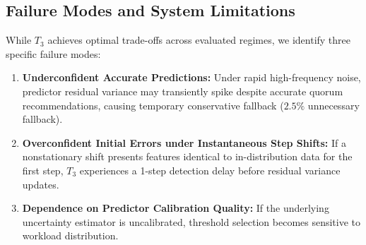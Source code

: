 \subsection{Failure Modes and System Limitations}
While $T_3$ achieves optimal trade-offs across evaluated regimes, we identify three specific failure modes:
\begin{enumerate}
    \item \textbf{Underconfident Accurate Predictions:} Under rapid high-frequency noise, predictor residual variance may transiently spike despite accurate quorum recommendations, causing temporary conservative fallback ($2.5\%$ unnecessary fallback).
    \item \textbf{Overconfident Initial Errors under Instantaneous Step Shifts:} If a nonstationary shift presents features identical to in-distribution data for the first step, $T_3$ experiences a 1-step detection delay before residual variance updates.
    \item \textbf{Dependence on Predictor Calibration Quality:} If the underlying uncertainty estimator is uncalibrated, threshold selection becomes sensitive to workload distribution.
\end{enumerate}
